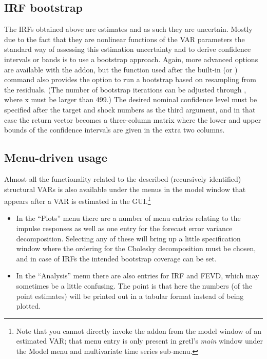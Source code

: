 \subsection{IRF bootstrap}

The IRFs obtained above are estimates and as such they are uncertain. 
Mostly due to the fact that they are nonlinear functions of the VAR parameters
the standard way of assessing this estimation uncertainty and to derive 
confidence intervals or bands is to use a bootstrap approach. Again, more
advanced options are available with the  addon, but the 
function used after the built-in  (or ) command also 
provides the option to run a bootstrap based on resampling from the residuals.
(The number of bootstrap iterations can be adjusted through ,
where x must be larger than 499.) 
The desired nominal confidence level must be specified after the target and 
shock numbers as the third argument, and in that case the return vector becomes
a three-column matrix where the lower and upper bounds of the confidence intervals
are given in the extra two columns.

\subsection{Menu-driven usage}

Almost all the functionality related to the described (recursively identified) structural 
VARs is also available under the menus in the model window that appears 
after a VAR is estimated in the GUI.\footnote{Note that you cannot directly invoke 
the  addon from the model window of an estimated VAR; that menu 
entry is only present in gretl's \emph{main} window under the Model menu and 
multivariate time series sub-menu.}

\begin{itemize}
\item In the ``Plots'' menu there are a number of menu entries relating to the
impulse responses as well as one entry for the forecast error variance decomposition.
Selecting any of these will bring up a little specification window where the ordering
for the Cholesky decomposition must be chosen, and in case of IRFs the intended 
bootstrap coverage can be set. 

\item In the ``Analysis'' menu there are also entries for IRF and FEVD, which may 
sometimes be a little confusing. The point is that here the numbers (of the point 
estimates) will be printed out in a tabular format instead of being plotted.

\end{itemize}

